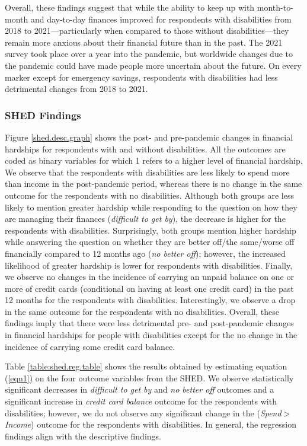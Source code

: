 \documentclass[12pt]{article}
\begin{document}
Overall, these findings suggest that while the ability to keep up with month-to-month and day-to-day finances improved for respondents with disabilities from 2018 to 2021---particularly when compared to those without disabilities---they remain more anxious about their financial future than in the past. The 2021 survey took place over a year into the pandemic, but worldwide changes due to the pandemic could have made people more uncertain about the future. On every marker except for emergency savings, respondents with disabilities had less detrimental changes from 2018 to 2021. 

\subsubsection{SHED Findings}
Figure \ref{shed.desc.graph} shows the post- and pre-pandemic changes in financial hardships for respondents with and without disabilities. All the outcomes are coded as binary variables for which 1 refers to a higher level of financial hardship. We observe that the respondents with disabilities are less likely to spend more than income in the post-pandemic period, whereas there is no change in the same outcome for the respondents with no disabilities. Although both groups are less likely to mention greater hardship while responding to the question on how they are managing their finances (\emph{difficult to get by}), the decrease is higher for the respondents with disabilities. Surprisingly, both groups mention higher hardship while answering the question on whether they are better off/the same/worse off financially compared to 12 months ago (\emph{no better off}); however, the increased likelihood of greater hardship is lower for respondents with disabilities. Finally, we observe no changes in the incidence of carrying an unpaid balance on one or more of credit cards (conditional on having at least one credit card) in the past 12 months for the respondents with disabilities. Interestingly, we observe a drop in the same outcome for the respondents with no disabilities. Overall, these findings imply that there were less detrimental pre- and post-pandemic changes in financial hardships for people with disabilities except for the no change in the incidence of carrying some credit card balance. 

Table \ref{table:shed.reg.table} shows the results obtained by estimating equation (\ref{eqn1}) on the four outcome variables from the SHED. We observe statistically significant decreases in \emph{difficult to get by} and \emph{no better off} outcomes and a significant increase in \emph{credit card balance} outcome for the respondents with disabilities; however, we do not observe any significant change in the (\emph{Spend$>$Income}) outcome for the respondents with disabilities. In general, the regression findings align with the descriptive findings. 
\end{document}
